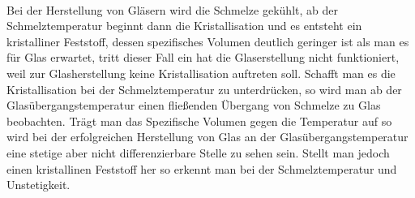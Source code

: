\documentclass[11pt,a4paper]{article}
\numberwithin{equation}{section}
\numberwithin{figure}{section}
\begin{document}
\\
\begin{addmargin}[25pt]{0pt}
Bei der Herstellung von Gläsern wird die Schmelze gekühlt, ab der Schmelztemperatur beginnt dann die Kristallisation und es entsteht ein kristalliner Feststoff, dessen spezifisches Volumen deutlich geringer ist als man es für Glas erwartet, tritt dieser Fall ein hat die Glaserstellung nicht funktioniert, weil zur Glasherstellung keine Kristallisation auftreten soll. Schafft man es die Kristallisation bei der Schmelztemperatur zu unterdrücken, so wird man ab der Glasübergangstemperatur einen fließenden Übergang von Schmelze zu Glas beobachten. Trägt man das Spezifische Volumen gegen die Temperatur auf so wird bei der erfolgreichen Herstellung von Glas an der Glasübergangstemperatur eine stetige aber nicht differenzierbare Stelle zu sehen sein. Stellt man jedoch einen kristallinen Feststoff her so erkennt man bei der Schmelztemperatur und Unstetigkeit. \\
\end{addmargin}
\end{document}
